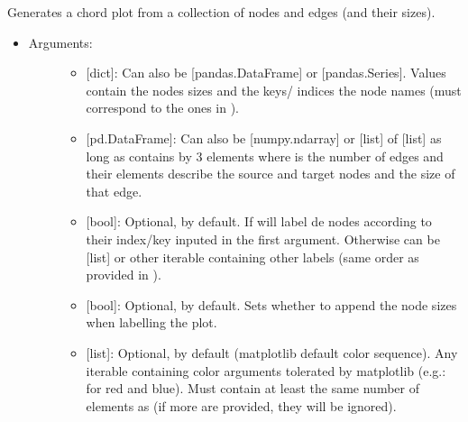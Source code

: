 \documentclass[letterpaper,10pt,english]{sphinxmanual}
\begin{document}
\begin{fulllineitems}
\label{\detokenize{plots:data_tools.plots.chordplot}}
Generates a chord plot from a collection of nodes and edges (and
their sizes).
\begin{itemize}
\item {} \begin{description}
\item[{Arguments:}] \leavevmode\begin{itemize}
\item {} 
 {[}dict{]}: Can also be {[}pandas.DataFrame{]} or
{[}pandas.Series{]}. Values contain the nodes sizes and the keys/
indices the node names (must correspond to the ones in
).

\item {} 
 {[}pd.DataFrame{]}: Can also be {[}numpy.ndarray{]} or {[}list{]}
of {[}list{]} as long as contains  by 3 elements where  is
the number of edges and their elements describe the source and
target nodes and the size of that edge.

\item {} 
 {[}bool{]}: Optional,  by default. If 
will label de nodes according to their index/key inputed in
the first argument. Otherwise can be {[}list{]} or other iterable
containing other labels (same order as provided in ).

\item {} 
 {[}bool{]}: Optional,  by default. Sets
whether to append the node sizes when labelling the plot.

\item {} 
 {[}list{]}: Optional,  by default (matplotlib
default color sequence). Any iterable containing color
arguments tolerated by matplotlib (e.g.: \sphinxcode{\sphinxupquote{{[}'r', 'b'{]}}} for
red and blue). Must contain at least the same number of
elements as  (if more are provided, they will be
ignored).


\end{itemize}
\end{description}
\end{itemize}
\end{fulllineitems}
\end{document}
